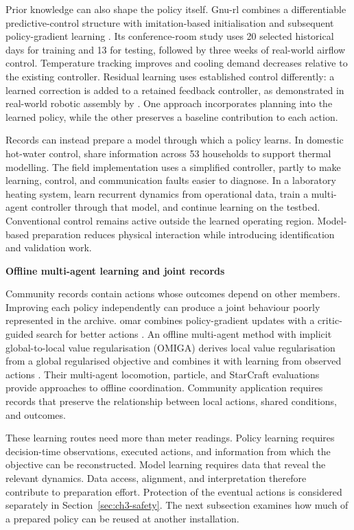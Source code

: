 Prior knowledge can also shape the policy itself. Gnu-\gls{rl} combines a differentiable predictive-control structure with imitation-based initialisation and subsequent policy-gradient learning \parencite{chen2020gnurl}. Its conference-room study uses 20 selected historical days for training and 13 for testing, followed by three weeks of real-world airflow control. Temperature tracking improves and cooling demand decreases relative to the existing controller. Residual learning uses established control differently: a learned correction is added to a retained feedback controller, as demonstrated in real-world robotic assembly by \textcite{johannink2019residual}. One approach incorporates planning into the learned policy, while the other preserves a baseline contribution to each action.

Records can instead prepare a model through which a policy learns. In domestic hot-water control, \textcite{recP02} share information across 53 households to support thermal modelling. The field implementation uses a simplified controller, partly to make learning, control, and communication faults easier to diagnose. In a laboratory heating system, \textcite{blad2023laboratory} learn recurrent dynamics from operational data, train a multi-agent controller through that model, and continue learning on the testbed. Conventional control remains active outside the learned operating region. Model-based preparation reduces physical interaction while introducing identification and validation work.

\smallskip
\noindent\textbf{Offline multi-agent learning and joint records}\par\nobreak\smallskip
Community records contain actions whose outcomes depend on other members. Improving each policy independently can produce a joint behaviour poorly represented in the archive. \gls{omar} combines policy-gradient updates with a critic-guided search for better actions \parencite{pan2022omar}. An offline multi-agent method with implicit global-to-local value regularisation (OMIGA) derives local value regularisation from a global regularised objective and combines it with learning from observed actions \parencite{wang2023omiga}. Their multi-agent locomotion, particle, and StarCraft evaluations provide approaches to offline coordination. Community application requires records that preserve the relationship between local actions, shared conditions, and outcomes.

These learning routes need more than meter readings. Policy learning requires decision-time observations, executed actions, and information from which the objective can be reconstructed. Model learning requires data that reveal the relevant dynamics. Data access, alignment, and interpretation therefore contribute to preparation effort. Protection of the eventual actions is considered separately in Section~\ref{sec:ch3-safety}. The next subsection examines how much of a prepared policy can be reused at another installation.

